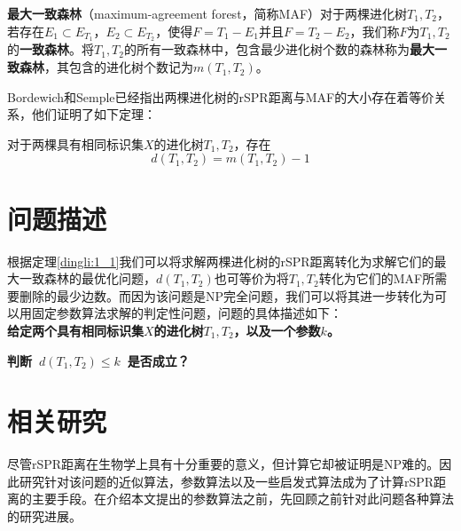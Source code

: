 \begin{dingyi}
\textbf{最大一致森林}（maximum-agreement forest，简称MAF）对于两棵进化树$T_1,T_2$，若存在$E_1 \subset E_{T_1}$，$E_2 \subset E_{T_2}$，使得$F=T_1 - E_1$并且$F=T_2 - E_2$，我们称$F$为$T_1,T_2$的\textbf{一致森林}。将$T_1,T_2$的所有一致森林中，包含最少进化树个数的森林称为\textbf{最大一致森林}，其包含的进化树个数记为\textbf{$m(T_1,T_2)$}。
\end{dingyi}

Bordewich和Semple已经指出两棵进化树的rSPR距离与MAF的大小存在着等价关系，他们证明了如下定理：
\begin{dingli}
\label{dingli:1_1}
对于两棵具有相同标识集$X$的进化树$T_1,T_2$，存在
	\begin{equation*}
		d(T_1,T_2)=m(T_1,T_2)-1
	\end{equation*}
\end{dingli}

\section{问题描述}\label{problem}
根据定理\ref{dingli:1_1}我们可以将求解两棵进化树的rSPR距离转化为求解它们的最大一致森林的最优化问题，$d(T_1,T_2)$也可等价为将$T_1,T_2$转化为它们的MAF所需要删除的最少边数。而因为该问题是NP完全问题，我们可以将其进一步转化为可以用固定参数算法求解的判定性问题，问题的具体描述如下：
\\

\textbf{给定两个具有相同标识集$X$的进化树$T_1,T_2$，以及一个参数$k$。}

\textbf{判断~$d(T_1,T_2) \le k$~是否成立？}
\clearpage

\section{相关研究}
尽管rSPR距离在生物学上具有十分重要的意义，但计算它却被证明是NP难的。因此研究针对该问题的近似算法，参数算法以及一些启发式算法成为了计算rSPR距离的主要手段。在介绍本文提出的参数算法之前，先回顾之前针对此问题各种算法的研究进展。

